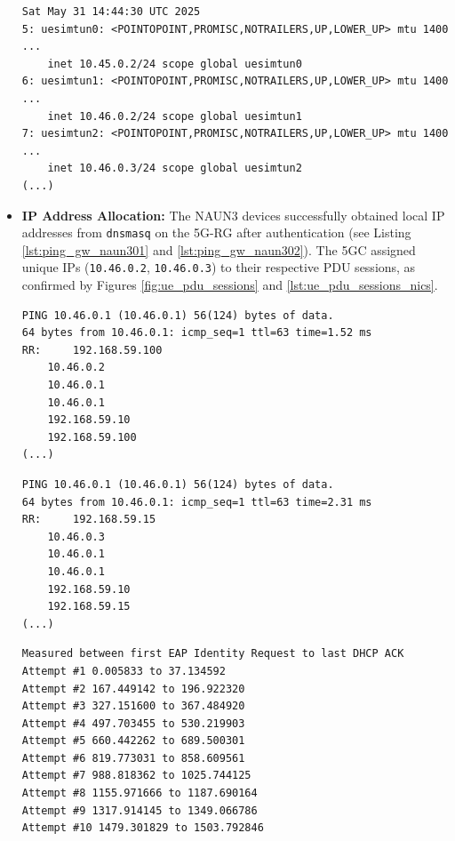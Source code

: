 \begin{itemize}
\begin{lstlisting}[caption=Network interfaces created by UERANSIM to bind to \acs{PDU} Sessions,label={lst:ue_pdu_sessions_nics}]
Sat May 31 14:44:30 UTC 2025
5: uesimtun0: <POINTOPOINT,PROMISC,NOTRAILERS,UP,LOWER_UP> mtu 1400 ...
    inet 10.45.0.2/24 scope global uesimtun0
6: uesimtun1: <POINTOPOINT,PROMISC,NOTRAILERS,UP,LOWER_UP> mtu 1400 ...
    inet 10.46.0.2/24 scope global uesimtun1
7: uesimtun2: <POINTOPOINT,PROMISC,NOTRAILERS,UP,LOWER_UP> mtu 1400 ...
    inet 10.46.0.3/24 scope global uesimtun2
(...)
\end{lstlisting}

    \item \textbf{\ac{IP} Address Allocation:} The \ac{NAUN3} devices successfully obtained local \ac{IP} addresses from \texttt{dnsmasq} on the \ac{5G-RG} after authentication (see Listing \ref{lst:ping_gw_naun301} and \ref{lst:ping_gw_naun302}). The \ac{5GC} assigned unique \acp{IP} (\texttt{10.46.0.2}, \texttt{10.46.0.3}) to their respective \ac{PDU} sessions, as confirmed by Figures \ref{fig:ue_pdu_sessions} and \ref{lst:ue_pdu_sessions_nics}.

\begin{lstlisting}[caption=\texttt{naun301} \texttt{ping -R} displaying route to the \acs{5GC},label={lst:ping_gw_naun301}]
PING 10.46.0.1 (10.46.0.1) 56(124) bytes of data.
64 bytes from 10.46.0.1: icmp_seq=1 ttl=63 time=1.52 ms
RR: 	192.168.59.100
    10.46.0.2
    10.46.0.1
    10.46.0.1
    192.168.59.10
    192.168.59.100
(...)
\end{lstlisting}

\begin{lstlisting}[caption=\texttt{naun3012} \texttt{ping -R} displaying route to the \acs{5GC},label={lst:ping_gw_naun302}]
PING 10.46.0.1 (10.46.0.1) 56(124) bytes of data.
64 bytes from 10.46.0.1: icmp_seq=1 ttl=63 time=2.31 ms
RR: 	192.168.59.15
    10.46.0.3
    10.46.0.1
    10.46.0.1
    192.168.59.10
    192.168.59.15
(...)
\end{lstlisting}

\begin{lstlisting}[caption=Timestamps from traffic captures at the \texttt{naun301} during authentication and \acs{IP} atribution,label={lst:onboarding_delay}]
Measured between first EAP Identity Request to last DHCP ACK
Attempt #1 0.005833 to 37.134592
Attempt #2 167.449142 to 196.922320
Attempt #3 327.151600 to 367.484920
Attempt #4 497.703455 to 530.219903
Attempt #5 660.442262 to 689.500301
Attempt #6 819.773031 to 858.609561
Attempt #7 988.818362 to 1025.744125
Attempt #8 1155.971666 to 1187.690164
Attempt #9 1317.914145 to 1349.066786
Attempt #10 1479.301829 to 1503.792846
\end{lstlisting}


\end{itemize}
